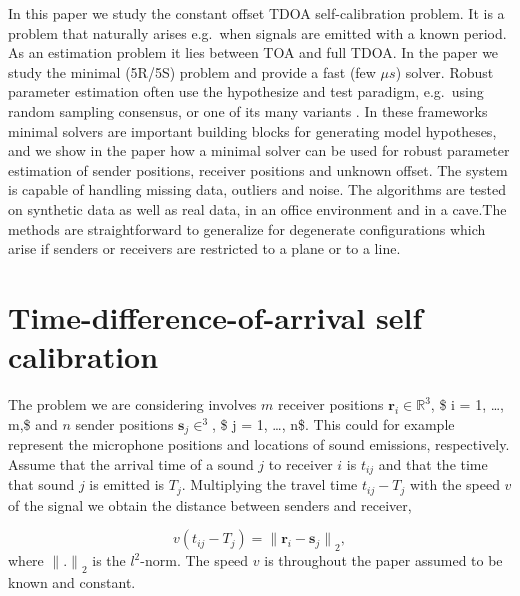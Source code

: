 \documentclass[
]{book}
\def\ltwo{{$l^2$}}
\providecommand{\norm}[1]{\lVert#1\rVert}
\begin{document}
In this paper we study the constant offset TDOA self-calibration problem. It is a problem that naturally arises e.g.~when signals are emitted with a known period. As an estimation problem it lies between TOA and full TDOA. In the paper we study the minimal (5R/5S) problem and provide a fast (few \(\mu s\)) solver.
Robust parameter estimation often use the hypothesize and test paradigm, e.g.~using random sampling consensus, \cite{fischler-bolles-ca-81} or one of its many variants \cite{chum2003locally,raguram2013usac,korman2018latent}. In these frameworks minimal solvers are important building blocks for generating model hypotheses, and we show in the paper how a minimal solver can be used for robust parameter estimation of sender positions, receiver positions and unknown offset. The system is capable of handling missing data, outliers and noise. The algorithms are tested on synthetic data as well as real data, in an office environment and in a cave.The methods are straightforward to generalize for degenerate configurations which arise if senders or receivers are restricted to a plane or to a line.

\hypertarget{time-difference-of-arrival-self-calibration}{%
\section{Time-difference-of-arrival self calibration}\label{time-difference-of-arrival-self-calibration}}

The problem we are considering involves \(m\) receiver positions \(\mathbf{r}_i \in \mathbb R^3\), \$ i = 1, \dots, m,\$ and \(n\) sender positions \(\mathbf{s}_j \in ^3\), \$ j = 1, \dots, n\$. This could for example represent the microphone positions and locations of sound emissions, respectively. Assume that the arrival time of a sound \(j\) to receiver \(i\) is \(t_{ij}\) and that the time that sound \(j\) is emitted is \(T_j\).
Multiplying the travel time \(t_{ij} - T_j\) with the speed \(v\) of the signal we obtain the distance between senders and receiver,

\begin{equation}
v (t_{ij}-T_j)   = {\norm{\mathbf{r}_i - \mathbf{s}_j}}_2 ,
\label{eq:tdoa}
\end{equation}
where \({\norm{.}}_2\) is the \ltwo-norm. The speed \(v\) is throughout the paper assumed to be known and constant.
\end{document}
